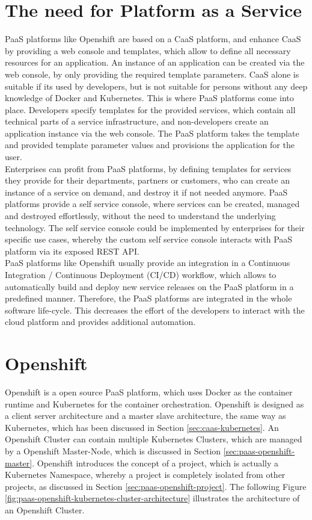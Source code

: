 \section{The need for Platform as a Service}
\label{sec:paas-need-for-paas}
PaaS platforms like Openshift are based on a CaaS platform, and enhance CaaS by providing a web console and templates, which allow to define all necessary resources for an application. An instance of an application can be created via the web console, by only providing the required template parameters. CaaS alone is suitable if its used by developers, but is not suitable for persons without any deep knowledge of Docker and Kubernetes. This is where PaaS platforms come into place. Developers specify templates for the provided services, which contain all technical parts of a service infrastructure, and non-developers create an application instance via the web console. The PaaS platform takes the template and provided template parameter values and provisions the application for the user. \\

Enterprises can profit from PaaS platforms, by defining templates for services they provide for their departments, partners or customers, who can create an instance of a service on demand, and destroy it if not needed anymore. PaaS platforms provide a self service console, where services can be created, managed and destroyed effortlessly, without the need to understand the underlying technology. The self service console could be implemented by enterprises for their specific use cases, whereby the custom self service console interacts with PaaS platform via its exposed REST API. \\

PaaS platforms like Openshift usually provide an integration in a Continuous Integration / Continuous Deployment (CI/CD) workflow, which allows to automatically build and deploy new service releases on the PaaS platform in a predefined manner. Therefore, the PaaS platforms are integrated in the whole software life-cycle. This decreases the effort of the developers to interact with the cloud platform and provides additional automation.
 
\section{Openshift}
\label{sec:paas-openshift}
Openshift is a open source PaaS platform, which uses Docker as the container runtime and Kubernetes for the container orchestration. Openshift is designed as a client server architecture and a master slave architecture, the same way as Kubernetes, which has been discussed in Section \vref{sec:caas-kubernetes}. An Openshift Cluster can contain multiple Kubernetes Clusters, which are managed by a Openshift Master-Node, which is discussed in Section \vref{sec:paas-openshift-master}. Openshift introduces the concept of a project,  which is actually a Kubernetes Namespace, whereby a project is completely isolated from other projects, as discussed in Section \vref{sec:paas-openshift-project}. The following Figure \vref{fig:paas-openshift-kubernetes-cluster-architecture} illustrates the architecture of an Openshift Cluster\cite{OpenshiftDeepDive2014, OpenshiftCoreConcepts2018}.

